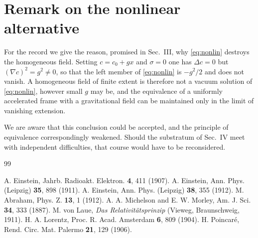 \documentclass[aps,prd,reprint,amsmath,amssymb,nofootinbib,longbibliography]{revtex4-2}
\begin{document}
\section{Remark on the nonlinear alternative}
\label{app:nl}

For the record we give the reason, promised in Sec.~III, why \eqref{eq:nonlin} destroys the
homogeneous field. Setting $c = c_0 + g x$ and $\sigma = 0$ one has $\Delta c = 0$ but
$(\nabla c)^{2} = g^{2} \neq 0$, so that the left member of \eqref{eq:nonlin} is $-g^{2}/2$ and does
not vanish. A homogeneous field of finite extent is therefore not a vacuum solution of
\eqref{eq:nonlin}, however small $g$ may be, and the equivalence of a uniformly accelerated frame
with a gravitational field can be maintained only in the limit of vanishing extension.

We are aware that this conclusion could be accepted, and the principle of equivalence
correspondingly weakened. Should the substratum of Sec.~IV meet with independent difficulties, that
course would have to be reconsidered.

\begin{thebibliography}{99}

 A. Einstein, Jahrb. Radioakt. Elektron. \textbf{4}, 411 (1907).
 A. Einstein, Ann. Phys. (Leipzig) \textbf{35}, 898 (1911).
 A. Einstein, Ann. Phys. (Leipzig) \textbf{38}, 355 (1912).
 M. Abraham, Phys. Z. \textbf{13}, 1 (1912).
 A. A. Michelson and E. W. Morley, Am. J. Sci. \textbf{34}, 333 (1887).
 M. von Laue, \emph{Das Relativit\"atsprinzip} (Vieweg, Braunschweig, 1911).
 H. A. Lorentz, Proc. R. Acad. Amsterdam \textbf{6}, 809 (1904).
 H. Poincar\'e, Rend. Circ. Mat. Palermo \textbf{21}, 129 (1906).

\end{thebibliography}
\end{document}
